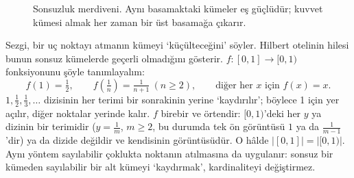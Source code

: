 \begin{figure}[htbp]
\centering
{}%
\caption{Sonsuzluk merdiveni. Aynı basamaktaki kümeler eş güçlüdür; kuvvet kümesi almak her zaman bir üst basamağa çıkarır.}
\end{figure}

\begin{ornek}[\textbf{Bir noktayı ‘yok etmek’: $[0,1]$ ile $[0,1)$.}]
Sezgi, bir uç noktayı atmanın kümeyi ‘küçülteceğini’ söyler. Hilbert otelinin hilesi bunun sonsuz kümelerde geçerli olmadığını gösterir. $f:[0,1]\to[0,1)$ fonksiyonunu şöyle tanımlayalım:
\[
f(1)=\tfrac12,\qquad f\!\left(\tfrac1n\right)=\tfrac1{n+1}\ (n\ge2),\qquad \text{diğer her }x\text{ için } f(x)=x .
\]
$1,\tfrac12,\tfrac13,\dots$ dizisinin her terimi bir sonrakinin yerine ‘kaydırılır’; böylece 1 için yer açılır, diğer noktalar yerinde kalır. $f$ birebir ve örtendir: $[0,1)$’deki her $y$ ya dizinin bir terimidir ($y=\tfrac1{m}$, $m\ge2$, bu durumda tek ön görüntüsü $1$ ya da $\tfrac1{m-1}$’dir) ya da dizide değildir ve kendisinin görüntüsüdür. O hâlde $|[0,1]|=|[0,1)|$. Aynı yöntem sayılabilir çoklukta noktanın atılmasına da uygulanır: sonsuz bir kümeden sayılabilir bir alt kümeyi ‘kaydırmak’, kardinaliteyi değiştirmez.
\end{ornek}

